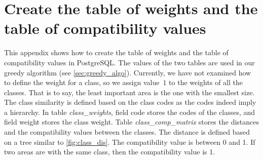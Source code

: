 \documentclass[twocolumn]{svjour3}          %
\begin{document}
\onecolumn
\appendix


\renewcommand{\theequation}{\thesection\arabic{equation}}
\renewcommand{\thetable}{\thesection\arabic{table}}



\section{Create the table of weights and the table of compatibility values}

\label{appx:create_tables}
This appendix shows how to create the table of weights and 
the table of compatibility values in PostgreSQL.
The values of the two tables are used in our greedy algorithm
(see \sect\ref{sec:greedy_algo}).
Currently, we have not examined 
how to define the weight for a class,
so we assign value~$1$ to the weights of all the classes.
That is to say, the least important area is the one with the smallest size.
The class similarity is defined based on the class codes 
as the codes indeed imply a hierarchy.
In table \emph{class\_weights}, 
field code stores the codes of the classes,
and field weight stores the class weight.
Table \emph{class\_comp\_matrix} 
stores the distances and the compatibility values between the classes.
The distance is defined based on a tree similar to \fig\ref{fig:class_dis}.
The compatibility value is between 0 and 1.
If two areas are with the same class, then the compatibility value is 1.



\bigskip


\end{document}
